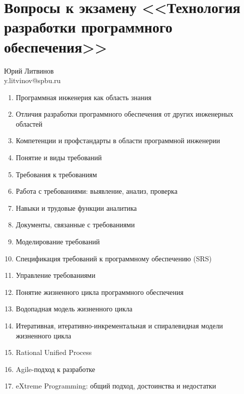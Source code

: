 \documentclass[a5paper]{article}
\begin{document}
\thispagestyle{empty}

\section*{Вопросы к экзамену <<Технология разработки программного обеспечения>>}

\begin{flushright}\begin{small}Юрий Литвинов\\\small{y.litvinov@spbu.ru}\end{small}\end{flushright}

\begin{enumerate}
    \item Программная инженерия как область знания
    \item Отличия разработки программного обеспечения от других инженерных областей
    \item Компетенции и профстандарты в области программной инженерии
    \item Понятие и виды требований
    \item Требования к требованиям
    \item Работа с требованиями: выявление, анализ, проверка
    \item Навыки и трудовые функции аналитика
    \item Документы, связанные с требованиями
    \item Моделирование требований
    \item Спецификация требований к программному обеспечению (SRS)
    \item Управление требованиями
    \item Понятие жизненного цикла программного обеспечения
    \item Водопадная модель жизненного цикла
    \item Итеративная, итеративно-инкрементальная и спиралевидная модели жизненного цикла
    \item Rational Unified Process
    \item Agile-подход к разработке
    \item eXtreme Programming: общий подход, достоинства и недостатки

\end{enumerate}
\end{document}
